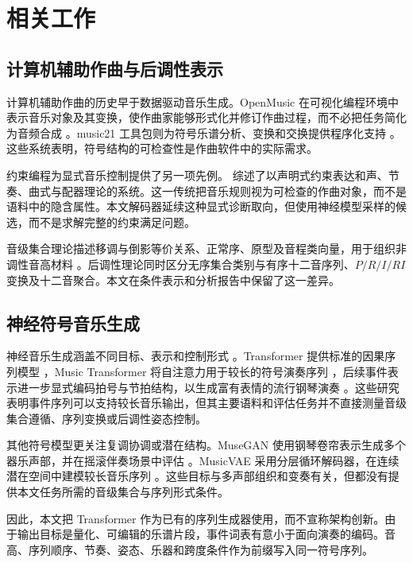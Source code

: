 \section{相关工作}
\label{sec:related-zh}

\subsection{计算机辅助作曲与后调性表示}

计算机辅助作曲的历史早于数据驱动音乐生成。OpenMusic 在可视化编程环境中表示音乐对象及其变换，使作曲家能够形式化并修订作曲过程，而不必把任务简化为音频合成 \citep{assayag1999openmusic}。music21 工具包则为符号乐谱分析、变换和交换提供程序化支持 \citep{cuthbert2010music21}。这些系统表明，符号结构的可检查性是作曲软件中的实际需求。

约束编程为显式音乐控制提供了另一项先例。\citet{anders2011constraint} 综述了以声明式约束表达和声、节奏、曲式与配器理论的系统。这一传统把音乐规则视为可检查的作曲对象，而不是语料中的隐含属性。本文解码器延续这种显式诊断取向，但使用神经模型采样的候选，而不是求解完整的约束满足问题。

音级集合理论描述移调与倒影等价关系、正常序、原型及音程类向量，用于组织非调性音高材料 \citep{forte1973structure,straus2016posttonal}。后调性理论同时区分无序集合类别与有序十二音序列、$P/R/I/RI$ 变换及十二音聚合。本文在条件表示和分析报告中保留了这一差异。

\subsection{神经符号音乐生成}

神经音乐生成涵盖不同目标、表示和控制形式 \citep{briot2020deep}。Transformer 提供标准的因果序列模型 \citep{vaswani2017attention}，Music Transformer 将自注意力用于较长的符号演奏序列 \citep{huang2019musictransformer}，后续事件表示进一步显式编码拍号与节拍结构，以生成富有表情的流行钢琴演奏 \citep{huang2020popmusic}。这些研究表明事件序列可以支持较长音乐输出，但其主要语料和评估任务并不直接测量音级集合遵循、序列变换或后调性姿态控制。

其他符号模型更关注复调协调或潜在结构。MuseGAN 使用钢琴卷帘表示生成多个器乐声部，并在摇滚伴奏场景中评估 \citep{dong2018musegan}。MusicVAE 采用分层循环解码器，在连续潜在空间中建模较长音乐序列 \citep{roberts2018hierarchical}。这些目标与多声部组织和变奏有关，但都没有提供本文任务所需的音级集合与序列形式条件。

因此，本文把 Transformer 作为已有的序列生成器使用，而不宣称架构创新。由于输出目标是量化、可编辑的乐谱片段，事件词表有意小于面向演奏的编码。音高、序列顺序、节奏、姿态、乐器和跨度条件作为前缀写入同一符号序列。

